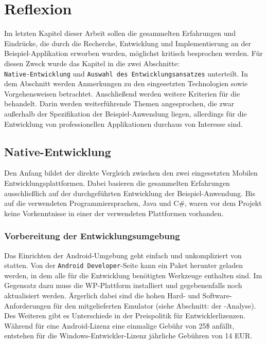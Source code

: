 \documentclass[Bachelorarbeit.tex]{subfiles}
\begin{document}
\chapter{Reflexion}

Im letzten Kapitel dieser Arbeit sollen die gesammelten Erfahrungen und Eindrücke, die durch die Recherche, Entwicklung und Implementierung an der Beispiel-Applikation erworben wurden, möglichst kritisch besprochen werden.
Für diesen Zweck wurde das Kapitel in die zwei Abschnitte:\\ \texttt{Native-Entwicklung} und \texttt{Auswahl des Entwicklungsansatzes} unterteilt.
In dem Abschnitt  werden Anmerkungen zu den eingesetzten Technologien sowie Vorgehensweisen betrachtet. 
Anschließend werden weitere Kriterien für die  behandelt.
Darin werden weiterführende Themen angesprochen, die zwar außerhalb der Spezifikation der Beispiel-Anwendung liegen, allerdings für die Entwicklung von professionellen Applikationen durchaus von Interesse sind.\\

\section{Native-Entwicklung}\label{sec:native-entwicklung}
Den Anfang bildet der direkte Vergleich zwischen den zwei eingesetzten Mobilen Entwicklungsplattformen.
Dabei basieren die gesammelten Erfahrungen ausschließlich auf der durchgeführten Entwicklung der Beispiel-Anwendung.
Bis auf die verwendeten Programmiersprachen, Java und C\#, waren vor dem Projekt keine Vorkenntnisse in einer der verwendeten Plattformen vorhanden. 

\subsection*{Vorbereitung der Entwicklungsumgebung}
Das Einrichten der Android-Umgebung geht einfach und unkompliziert von statten. 
Von der \texttt{Android Developer}-Seite kann ein Paket herunter geladen werden, in dem alle für die Entwicklung benötigten Werkzeuge enthalten sind.
Im Gegensatz dazu muss die \ac{WP}-Plattform installiert und gegebenenfalls noch aktualisiert werden. 
Ärgerlich dabei sind die hohen Hard- und Software-Anforderungen für den mitgelieferten Emulator (siehe Abschnitt:  der -Analyse).
Des Weiteren gibt es Unterschiede in der Preispolitik für Entwicklerlizenzen. 
Während für eine Android-Lizenz eine einmalige Gebühr von 25\$ anfällt, entstehen für die Windows-Entwickler-Lizenz jährliche Gebühren von 14 EUR.
\parencites[vgl.:][]{android_entwicklerregistrierung}[sowie:][]{wp8_account-kosten}\\
\end{document}
